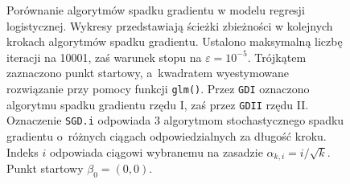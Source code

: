 \begin{figure}[hbt!]
  \caption[Porównanie algorytmów spadku gradientu dla punktu startowego $\beta_0 = (0,0)$.]{\label{fig:scasd}Porównanie algorytmów spadku gradientu w modelu regresji logistycznej. Wykresy przedstawiają ścieżki zbieżności w kolejnych krokach algorytmów spadku gradientu. Ustalono maksymalną liczbę iteracji na 10001, zaś warunek stopu na $\varepsilon=10^{-5}$. Trójkątem zaznaczono punkt startowy, a~kwadratem wyestymowane rozwiązanie przy pomocy funkcji \texttt{glm()}. Przez \texttt{GDI} oznaczono algorytmu spadku gradientu rzędu I, zaś przez \texttt{GDII} rzędu II. Oznaczenie \texttt{SGD.i} odpowiada 3 algorytmom stochastycznego spadku gradientu o~różnych ciągach odpowiedzialnych za długość kroku. Indeks $i$ odpowiada ciągowi wybranemu na zasadzie $\alpha_{k,i} = i/\sqrt{k}$. Punkt startowy $\beta_0 = (0,0)$.}
\end{figure}


